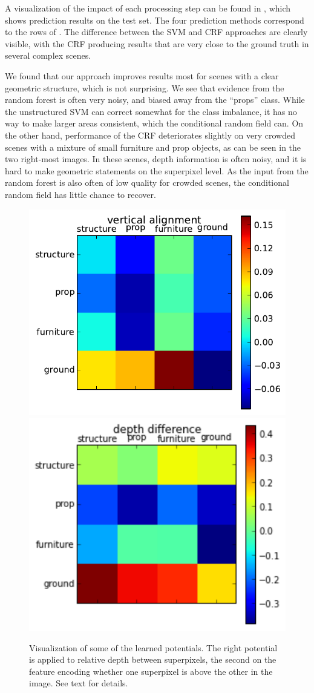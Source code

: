 \documentclass[a4paper, 10pt, conference]{ieeeconf}      %
\begin{document}
A visualization of the impact of each processing step can be found in
, which shows prediction results on the test set.  The four
prediction methods correspond to the rows of .  The difference
between the SVM and CRF approaches are clearly visible, with the CRF producing
results that are very close to the ground truth in several complex scenes.

We found that our approach improves results most for scenes with a clear geometric structure,
which is not surprising. We see that evidence from the random forest is often very noisy, and biased
away from the ``props'' class. While the unstructured SVM can correct somewhat
for the class imbalance, it has no way to make larger areas consistent, which
the conditional random field can.
On the other hand, performance of the CRF deteriorates slightly on very crowded
scenes with a mixture of small furniture and prop objects, as
can be seen in the two right-most images. In these scenes, depth information is
often noisy, and it is hard to make geometric statements on the superpixel
level. As the input from the random forest is also often of low quality for
crowded scenes, the conditional random field has little chance to recover.

\begin{figure}
    \begin{center}
        \includegraphics[width=.45\linewidth]{images/vertical_alignment}\vspace{1mm}
    \includegraphics[width=.45\linewidth]{images/depth_difference}
    \end{center}
    \caption{%
        Visualization of some of the learned potentials. The right potential is
        applied to relative depth between superpixels, the second on the
        feature encoding whether one superpixel is above the other in the
        image. See text for details.
    }
\end{figure}
\end{document}
